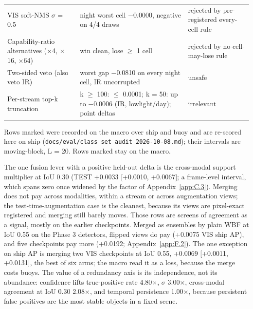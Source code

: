 \documentclass[journal,onecolumn]{IEEEtran}
\begin{document}
\begin{table}[htbp]
\begin{tabularx}{\linewidth}{>{\raggedright\arraybackslash}X>{\raggedright\arraybackslash}X>{\raggedright\arraybackslash}X}
VIS soft-NMS $\sigma$ = 0.5 \textdaggerdbl{} & night worst cell $-$0.0000, negative on 4/4 draws & rejected by pre-registered every-cell rule \\
Capability-ratio alternatives ($\times$4, $\times$16, $\times$64) & win clean, lose $\geq$ 1 cell & rejected by no-cell-may-lose rule \\
Two-sided veto (also veto IR) & worst gap $-$0.0810 on every night cell, IR uncorrupted & unsafe \\
Per-stream top-k truncation \textdagger{} & k $\geq$ 100: $\leq$ 0.0001; k = 50: up to $-$0.0006 (IR, lowlight/day); point deltas & irrelevant \\
\bottomrule
\end{tabularx}
\par\smallskip\raggedright\footnotesize Rows marked \textdagger{} were recorded on the macro over ship and buoy and are re-scored here on ship (\texttt{docs/\allowbreak{}eval/\allowbreak{}class\_\allowbreak{}set\_\allowbreak{}audit\_\allowbreak{}2026-\allowbreak{}10-\allowbreak{}08.md}); their intervals are moving-block, L = 20. Rows marked \textdaggerdbl{} stay on the macro.
\end{table}
The one fusion lever with a positive held-out delta is the cross-modal support multiplier at IoU 0.30 (TEST +0.0033 [+0.0010, +0.0067]; a frame-level interval, which spans zero once widened by the factor of Appendix~\ref{app:C.3}). Merging does not pay across modalities, within a stream or across augmentation views; the test-time-augmentation case is the cleanest, because its views are pixel-exact registered and merging still barely moves. Those rows are screens of agreement as a signal, mostly on the earlier checkpoints. Merged as ensembles by plain WBF at IoU 0.55 on the Phase 3 detectors, flipped views do pay (+0.0075 VIS ship AP), and five checkpoints pay more (+0.0192; Appendix~\ref{app:F.2}). The one exception on ship AP is merging two VIS checkpoints at IoU 0.55, +0.0069 [+0.0011, +0.0131], the best of six arms; the macro read it as a loss, because the merge costs buoys. The value of a redundancy axis is its independence, not its abundance: confidence lifts true-positive rate 4.80$\times$, $\sigma$ 3.00$\times$, cross-modal agreement at IoU 0.30 2.08$\times$, and temporal persistence 1.00$\times$, because persistent false positives are the most stable objects in a fixed scene.
\end{document}
